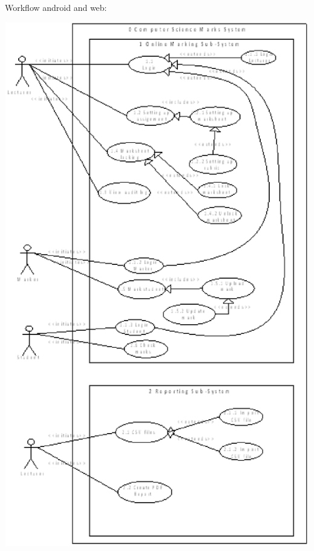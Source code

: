 \documentclass{article}
\begin{document}
Workflow android and web:

\includegraphics*[width=5.37in, height=9.02in, keepaspectratio=false]{image34}
\end{document}
